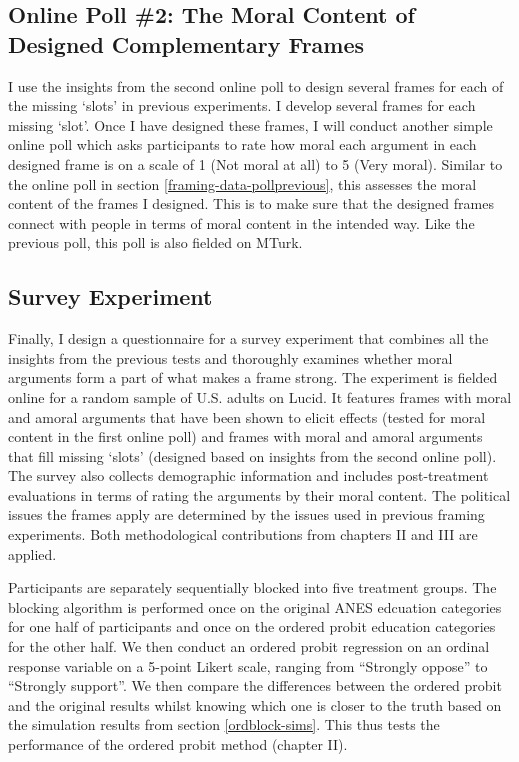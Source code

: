 \documentclass[12pt,econ]{sources/authesis}
\begin{document}
\hypertarget{framing-data-polldesigned}{%
\subsection{Online Poll \#2: The Moral Content of Designed Complementary Frames}\label{framing-data-polldesigned}}

I use the insights from the second online poll to design several frames for each of the missing `slots' in previous experiments. I develop several frames for each missing `slot'. Once I have designed these frames, I will conduct another simple online poll which asks participants to rate how moral each argument in each designed frame is on a scale of 1 (Not moral at all) to 5 (Very moral). Similar to the online poll in section \ref{framing-data-pollprevious}, this assesses the moral content of the frames I designed. This is to make sure that the designed frames connect with people in terms of moral content in the intended way. Like the previous poll, this poll is also fielded on MTurk.

\hypertarget{framing-data-survey}{%
\subsection{Survey Experiment}\label{framing-data-survey}}

Finally, I design a questionnaire for a survey experiment that combines all the insights from the previous tests and thoroughly examines whether moral arguments form a part of what makes a frame strong. The experiment is fielded online for a random sample of U.S. adults on Lucid. It features frames with moral and amoral arguments that have been shown to elicit effects (tested for moral content in the first online poll) and frames with moral and amoral arguments that fill missing `slots' (designed based on insights from the second online poll). The survey also collects demographic information and includes post-treatment evaluations in terms of rating the arguments by their moral content. The political issues the frames apply are determined by the issues used in previous framing experiments. Both methodological contributions from chapters II and III are applied.

Participants are separately sequentially blocked into five treatment groups. The blocking algorithm is performed once on the original ANES edcuation categories for one half of participants and once on the ordered probit education categories for the other half. We then conduct an ordered probit regression on an ordinal response variable on a 5-point Likert scale, ranging from ``Strongly oppose'' to ``Strongly support''. We then compare the differences between the ordered probit and the original results whilst knowing which one is closer to the truth based on the simulation results from section \ref{ordblock-sims}. This thus tests the performance of the ordered probit method (chapter II).
\end{document}
